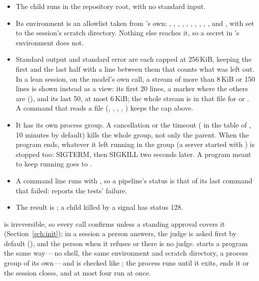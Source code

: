 \begin{itemize}
  \item The child runs in the repository root, with no standard input.
  \item Its environment is an allowlist taken from \nodwyn's own:
    , , , ,
    , , , ,
    , ,  and , with
     set to the session's scratch directory. Nothing else
    reaches it, so a secret in \nodwyn's environment does not.
  \item Standard output and standard error are each capped at 256\,KiB,
    keeping the first and the last half with a line between them that
    counts what was left out. In a lean session, on the model's own call, a
    stream of more than 8\,KiB or 150 lines is shown instead as a view: its first 20 lines, a
    marker where the others are (), and its last 50,
    at most 6\,KiB; the whole stream is in that file for  or
    . A command that reads a file (, ,
    , , ) keeps the cap above.
  \item It has its own process group. A cancellation or the timeout
    ( in the \code{[loop]} table of
    , 10 minutes by default) kills the whole group, not
    only the parent. When the program ends, whatever it left running in
    the group (a server started with \code{\&}) is stopped too: SIGTERM,
    then SIGKILL two seconds later. A program meant to keep running goes
    to .
  \item A  command line runs with , so a
    pipeline's status is that of its last command that failed:
     reports the tests' failure.
  \item The result is ; a child killed by a signal has status 128.
\end{itemize}

 is irreversible, so every call confirms unless a standing
approval covers it (Section~\ref{sch:init}); in a session a person
answers, the judge is asked first by default (),
and the person when it refuses or there is no judge. 
starts a program the same way\,---\,no shell, the same environment and scratch
directory, a process group of its own\,---\,and is checked like
; the process runs until it exits,  ends
it or the session closes, and at most four run at once.

